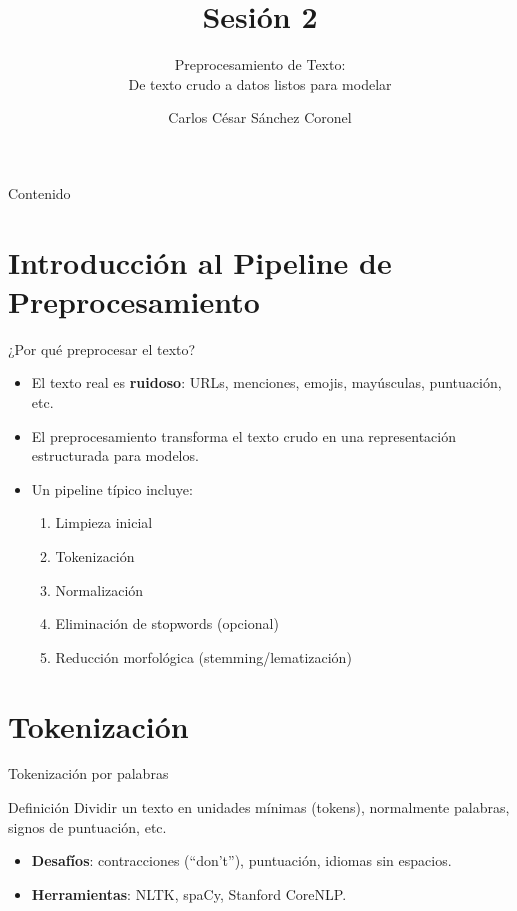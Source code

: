 \documentclass[aspectratio=169, 10pt, xcolor=table]{beamer}
\title[SESIÓN 2 NLP]{\textbf{Sesión 2}}
\subtitle{Preprocesamiento de Texto: \\ De texto crudo a datos listos para modelar}
\author[Prof. C. Sánchez]{Carlos César Sánchez Coronel}
\institute{\textbf{NLP}}
\date{}
\begin{document}
\begin{frame}
    \titlepage
\end{frame}

\begin{frame}{Contenido}
    \tableofcontents
\end{frame}

\section{Introducción al Pipeline de Preprocesamiento}

\begin{frame}{¿Por qué preprocesar el texto?}
    \begin{itemize}
        \item El texto real es \textbf{ruidoso}: URLs, menciones, emojis, mayúsculas, puntuación, etc.
        \item El preprocesamiento transforma el texto crudo en una representación estructurada para modelos.
        \item Un pipeline típico incluye:
        \begin{enumerate}
            \item Limpieza inicial
            \item Tokenización
            \item Normalización
            \item Eliminación de stopwords (opcional)
            \item Reducción morfológica (stemming/lematización)
        \end{enumerate}
    \end{itemize}
\end{frame}

\section{Tokenización}

\begin{frame}{Tokenización por palabras}
    \begin{block}{Definición}
        Dividir un texto en unidades mínimas (tokens), normalmente palabras, signos de puntuación, etc.
    \end{block}
    \begin{itemize}
        \item \textbf{Desafíos}: contracciones (``don't''), puntuación, idiomas sin espacios.
        \item \textbf{Herramientas}: NLTK, spaCy, Stanford CoreNLP.
    \end{itemize}
\end{frame}
\end{document}

